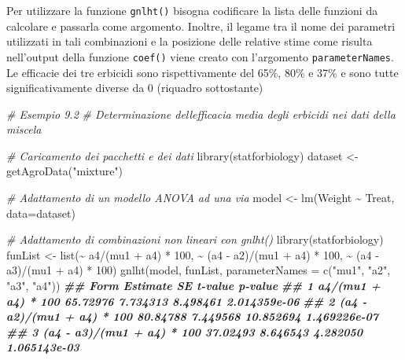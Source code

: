 \documentclass[
  12pt,
]{book}
\newenvironment{Shaded}{\begin{snugshade}}{\end{snugshade}}
\newcommand{\AttributeTok}[1]{\textcolor[rgb]{0.77,0.63,0.00}{#1}}
\newcommand{\CommentTok}[1]{\textcolor[rgb]{0.56,0.35,0.01}{\textit{#1}}}
\newcommand{\DecValTok}[1]{\textcolor[rgb]{0.00,0.00,0.81}{#1}}
\newcommand{\DocumentationTok}[1]{\textcolor[rgb]{0.56,0.35,0.01}{\textbf{\textit{#1}}}}
\newcommand{\FunctionTok}[1]{\textcolor[rgb]{0.00,0.00,0.00}{#1}}
\newcommand{\NormalTok}[1]{#1}
\newcommand{\OtherTok}[1]{\textcolor[rgb]{0.56,0.35,0.01}{#1}}
\newcommand{\SpecialCharTok}[1]{\textcolor[rgb]{0.00,0.00,0.00}{#1}}
\newcommand{\StringTok}[1]{\textcolor[rgb]{0.31,0.60,0.02}{#1}}
\begin{document}
Per utilizzare la funzione \texttt{gnlht()} bisogna codificare la lista delle funzioni da calcolare e passarla come argomento. Inoltre, il legame tra il nome dei parametri utilizzati in tali combinazioni e la posizione delle relative stime come risulta nell'output della funzione \texttt{coef()} viene creato con l'argomento \texttt{parameterNames}. Le efficacie dei tre erbicidi sono rispettivamente del 65\%, 80\% e 37\% e sono tutte significativamente diverse da 0 (riquadro sottostante)

\begin{Shaded}
\begin{Highlighting}[]
\CommentTok{\# Esempio 9.2}
\CommentTok{\# Determinazione dell\textquotesingle{}efficacia media degli erbicidi nei dati della miscela}

\CommentTok{\# Caricamento dei pacchetti e dei dati}
\FunctionTok{library}\NormalTok{(statforbiology)}
\NormalTok{dataset }\OtherTok{\textless{}{-}} \FunctionTok{getAgroData}\NormalTok{(}\StringTok{"mixture"}\NormalTok{)}

\CommentTok{\# Adattamento di un modello ANOVA ad una via}
\NormalTok{model }\OtherTok{\textless{}{-}} \FunctionTok{lm}\NormalTok{(Weight }\SpecialCharTok{\textasciitilde{}}\NormalTok{ Treat, }\AttributeTok{data=}\NormalTok{dataset)}

\CommentTok{\# Adattamento di combinazioni non lineari con \textquotesingle{}gnlht()\textquotesingle{}}
\FunctionTok{library}\NormalTok{(statforbiology)}
\NormalTok{funList }\OtherTok{\textless{}{-}} \FunctionTok{list}\NormalTok{(}\SpecialCharTok{\textasciitilde{}}\NormalTok{ a4}\SpecialCharTok{/}\NormalTok{(mu1 }\SpecialCharTok{+}\NormalTok{ a4) }\SpecialCharTok{*} \DecValTok{100}\NormalTok{,}
                \SpecialCharTok{\textasciitilde{}}\NormalTok{ (a4 }\SpecialCharTok{{-}}\NormalTok{ a2)}\SpecialCharTok{/}\NormalTok{(mu1 }\SpecialCharTok{+}\NormalTok{ a4) }\SpecialCharTok{*} \DecValTok{100}\NormalTok{, }
                \SpecialCharTok{\textasciitilde{}}\NormalTok{ (a4 }\SpecialCharTok{{-}}\NormalTok{ a3)}\SpecialCharTok{/}\NormalTok{(mu1 }\SpecialCharTok{+}\NormalTok{ a4) }\SpecialCharTok{*} \DecValTok{100}\NormalTok{)}
\FunctionTok{gnlht}\NormalTok{(model, funList, }\AttributeTok{parameterNames =} \FunctionTok{c}\NormalTok{(}\StringTok{"mu1"}\NormalTok{, }\StringTok{"a2"}\NormalTok{, }\StringTok{"a3"}\NormalTok{, }\StringTok{"a4"}\NormalTok{))}
\DocumentationTok{\#\#                         Form Estimate       SE   t{-}value      p{-}value}
\DocumentationTok{\#\# 1        a4/(mu1 + a4) * 100 65.72976 7.734313  8.498461 2.014359e{-}06}
\DocumentationTok{\#\# 2 (a4 {-} a2)/(mu1 + a4) * 100 80.84788 7.449568 10.852694 1.469226e{-}07}
\DocumentationTok{\#\# 3 (a4 {-} a3)/(mu1 + a4) * 100 37.02493 8.646543  4.282050 1.065143e{-}03}
\end{Highlighting}
\end{Shaded}
\end{document}
